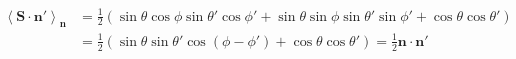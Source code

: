 \begin{sol}
    \begin{equation}
        \begin{aligned}
            \left<\mathbf{S}\cdot\mathbf{n'} \right>_\mathbf{n}&=\frac{1}{2}\left(\sin\theta\cos\phi\sin\theta'\cos\phi'+\sin\theta\sin\phi\sin\theta'\sin\phi'+\cos\theta\cos\theta'\right)\\
            &=\frac{1}{2}\left(\sin\theta\sin\theta'\cos\left(\phi-\phi' \right) + \cos\theta\cos\theta'\right)=\frac{1}{2}\mathbf{n}\cdot\mathbf{n'}
        \end{aligned}
    \end{equation}
\end{sol}
